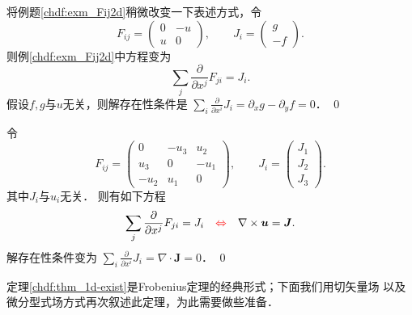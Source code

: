 \begin{example}\label{chdf:exm_Fij2d-2}
    将例题\ref{chdf:exm_Fij2d}稍微改变一下表述方式，令
    \begin{equation}
        F_{ij}=\begin{pmatrix}
            0 & -u \\ u &0
        \end{pmatrix} ,\qquad
        J_{i}= \begin{pmatrix}
            g\\ -f
        \end{pmatrix}.
    \end{equation}
    则例\ref{chdf:exm_Fij2d}中方程变为
    \begin{equation}
        \sum_{j}\frac{\partial}{\partial x^j} F_{ji} = J_{i} .
    \end{equation}
    假设$f,g$与$u$无关，则解存在性条件是
    $\sum_{i}\frac{\partial}{\partial x^i}J_i= \partial_x g -\partial_y f =0 $．     \qed
\end{example}

\begin{example}\label{chdf:exm_Fij2d-3}
    令
    \begin{equation}
        F_{ij}=\begin{pmatrix}
            0   & -u_3 &  u_2 \\
            u_3 &  0   & -u_1 \\
            -u_2&  u_1 & 0
        \end{pmatrix} ,\qquad
        J_{i}= \begin{pmatrix}
            J_1 \\  J_2 \\  J_3
        \end{pmatrix}.
    \end{equation}
    其中$J_i$与$u_i$无关．    则有如下方程
    \begin{equation}
        \sum_{j}\frac{\partial}{\partial x^j} F_{ji} = J_{i}
        {\quad \color{red}\Leftrightarrow \quad}
        \nabla\times \boldsymbol{u} = \boldsymbol{J} .
    \end{equation}
    解存在性条件变为
    $\sum_{i}\frac{\partial}{\partial x^i}J_i= \nabla \cdot \boldsymbol{J}=0 $．    \qed
\end{example}

定理\ref{chdf:thm_1d-exist}是Frobenius定理的经典形式；下面我们用切矢量场
以及微分型式场方式再次叙述此定理，为此需要做些准备．



